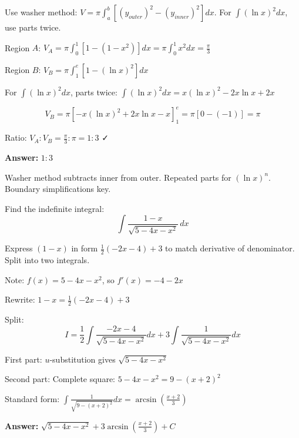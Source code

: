 \begin{hint}
Use washer method: $V = \pi\int_a^b [(y_{outer})^2 - (y_{inner})^2] dx$. For $\int (\ln x)^2 dx$, use parts twice.
\end{hint}

\begin{solution}
Region $A$: $V_A = \pi\int_0^1 [1 - (1-x^2)] dx = \pi\int_0^1 x^2 dx = \frac{\pi}{3}$

Region $B$: $V_B = \pi\int_1^e [1 - (\ln x)^2] dx$

For $\int (\ln x)^2 dx$, parts twice: $\int (\ln x)^2 dx = x(\ln x)^2 - 2x\ln x + 2x$

\[
V_B = \pi[-x(\ln x)^2 + 2x\ln x - x]_1^e = \pi[0 - (-1)] = \pi
\]

Ratio: $V_A : V_B = \frac{\pi}{3} : \pi = 1 : 3$ ✓

\textbf{Answer:} $\boxed{1:3}$
\end{solution}

\begin{takeaways}
Washer method subtracts inner from outer. Repeated parts for $(\ln x)^n$. Boundary simplifications key.
\end{takeaways}

\vspace{1cm}

\begin{problem}
Find the indefinite integral:
\[
\int \frac{1-x}{\sqrt{5 - 4x - x^2}} \, dx
\]
\end{problem}

\begin{hint}
Express $(1-x)$ in form $\frac{1}{2}(-2x-4) + 3$ to match derivative of denominator. Split into two integrals.
\end{hint}

\begin{solution}
Note: $f(x) = 5 - 4x - x^2$, so $f'(x) = -4 - 2x$

Rewrite: $1-x = \frac{1}{2}(-2x-4) + 3$

Split:
\[
I = \frac{1}{2}\int \frac{-2x-4}{\sqrt{5-4x-x^2}} dx + 3\int \frac{1}{\sqrt{5-4x-x^2}} dx
\]

First part: $u$-substitution gives $\sqrt{5-4x-x^2}$

Second part: Complete square: $5-4x-x^2 = 9-(x+2)^2$

Standard form: $\int \frac{1}{\sqrt{9-(x+2)^2}} dx = \arcsin\left(\frac{x+2}{3}\right)$

\textbf{Answer:} $\boxed{\sqrt{5-4x-x^2} + 3\arcsin\left(\frac{x+2}{3}\right) + C}$
\end{solution}


